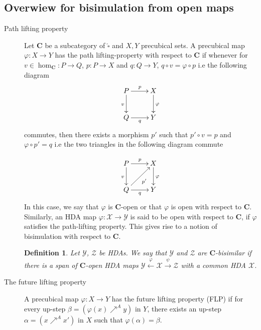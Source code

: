 \documentclass[11pt,a4paper,oldfontcommands]{memoir}
\newtheorem{definition}{Definition}
\begin{document}
\subsection{Overwiew for bisimulation from open maps}\label{subsec: open map}
\begin{description}
    \item[\hspace{0.5cm} Path lifting property]
  Let $\mathbf{C}$ be a subcategory of $\widehat{\square}$ and $X,Y$ precubical sets. A precubical map $\varphi: X \to Y$ has the path lifting-property with respect to $\mathbf{C}$ if whenever for $v \in \hom_{\mathbf{C}}: P \to Q$, $p: P \rightarrow X$ and $q: Q \rightarrow Y$, $q \circ v = \varphi \circ p$ i.e the following diagram $$
    \xymatrix{%
      P \ar[r]^{p}
      \ar[d]_{v} \ar@{}[dr]  &
      X \ar[d]^{\varphi} \\
      Q \ar[r]_{q}  & Y 
    }
$$
commutes, %
then there exists a morphism $p'$ such that $p'\circ v=p$ and $\varphi \circ p'=q$ i.e the two triangles in the following diagram commute

$$
    \xymatrix{%
      P \ar[r]^{p}
      \ar[d]_{v} \ar@{}[dr]  &
      X \ar[d]^{\varphi} \\
      Q  \ar[r]_{q} \ar[ur]_{p'} & Y  
    }
$$
 In this case, we say that $\varphi$ is $\mathbf{C}$-open or that $\varphi$ is open with respect to $\mathbf{C}$. Similarly, an HDA map $\varphi: \mathcal{X} \to \mathcal{Y}$ is said to be open with respect to $\mathbf{C}$, if $\varphi$ satisfies the path-lifting property. This gives rise to a notion of bisimulation with respect to $\mathbf{C}$. 
 \begin{definition} \label{def: U bis from open map}
Let $\mathcal{Y}$, $\mathcal{Z}$ be HDAs. We say that $\mathcal{Y}$ and $\mathcal{Z}$ are $\mathbf{C}$-bisimilar if there is a span of $\mathbf{C}$-open HDA maps $\mathcal{Y} \stackrel{\varphi}{\longleftarrow} \mathcal{X} \stackrel{\psi}{\longrightarrow} \mathcal{Z}$ with a common HDA $\mathcal{X}$.
     \end{definition} 

\item[\hspace{0.5cm} The future lifting property]  A precubical map $\varphi: X \to Y$ has the future lifting property (FLP) if for every up-step $\beta=(\varphi(x) \nearrow^A y)$ in $Y$, there exists an up-step $\alpha=(x \nearrow^A x')$ in $X$ such that $\varphi(\alpha)=\beta$. 


\end{description}
\end{document}
